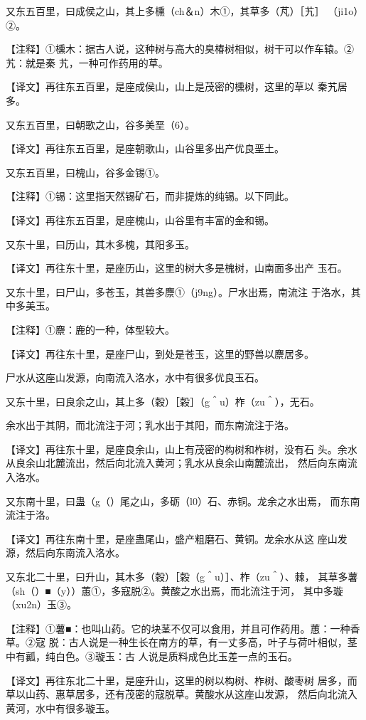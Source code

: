 \documentclass[a4paper,12pt,UTF8,twoside]{ctexbook}
\begin{document}
又东五百里，曰成侯之山，其上多櫄（ch＆n）木①，其草多（芃）［艽］ （ji1o）②。

【注释】①櫄木：据古人说，这种树与高大的臭椿树相似，树干可以作车辕。②艽：就是秦 艽，一种可作药用的草。

【译文】再往东五百里，是座成侯山，山上是茂密的櫄树，这里的草以 秦艽居多。

又东五百里，曰朝歌之山，谷多美垩（6）。

【译文】再往东五百里，是座朝歌山，山谷里多出产优良垩土。

又东五百里，曰槐山，谷多金锡①。

【注释】①锡：这里指天然锡矿石，而非提炼的纯锡。以下同此。

【译文】再往东五百里，是座槐山，山谷里有丰富的金和锡。

又东十里，曰历山，其木多槐，其阳多玉。

【译文】再往东十里，是座历山，这里的树大多是槐树，山南面多出产 玉石。

又东十里，曰尸山，多苍玉，其兽多麖①（j9ng）。尸水出焉，南流注 于洛水，其中多美玉。

【注释】①麖：鹿的一种，体型较大。

【译文】再往东十里，是座尸山，到处是苍玉，这里的野兽以麖居多。

尸水从这座山发源，向南流入洛水，水中有很多优良玉石。

又东十里，曰良余之山，其上多（穀）［榖］（g＾u）柞（zu＾），无石。

余水出于其阴，而北流注于河；乳水出于其阳，而东南流注于洛。

【译文】再往东十里，是座良余山，山上有茂密的构树和柞树，没有石 头。余水从良余山北麓流出，然后向北流入黄河；乳水从良余山南麓流出， 然后向东南流入洛水。

又东南十里，曰蛊（g（）尾之山，多砺（l0）石、赤铜。龙余之水出焉， 而东南流注于洛。

【译文】再往东南十里，是座蛊尾山，盛产粗磨石、黄铜。龙余水从这 座山发源，然后向东南流入洛水。

又东北二十里，曰升山，其木多（穀）［榖（g＾u）］、柞（zu＾）、棘， 其草多薯（sh（）■（y））蕙①，多寇脱②。黄酸之水出焉，而北流注于河， 其中多璇（xu2n）玉③。

【注释】①薯■：也叫山药。它的块茎不仅可以食用，并且可作药用。蕙：一种香草。②寇 脱：古人说是一种生长在南方的草，有一丈多高，叶子与荷叶相似，茎中有瓤，纯白色。③璇玉：古 人说是质料成色比玉差一点的玉石。

【译文】再往东北二十里，是座升山，这里的树以构树、柞树、酸枣树 居多，而草以山药、惠草居多，还有茂密的寇脱草。黄酸水从这座山发源， 然后向北流入黄河，水中有很多璇玉。
\end{document}
